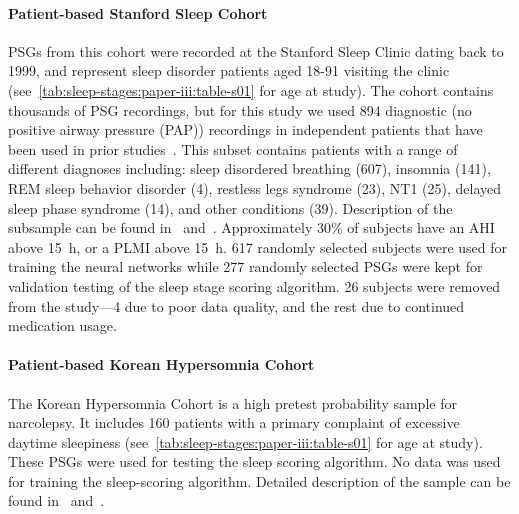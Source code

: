 \paragraph{Patient-based Stanford Sleep Cohort}
\acp{PSG} from this cohort were recorded at the Stanford Sleep Clinic dating back to 1999, and represent sleep disorder patients aged 18-91 visiting the clinic (see~\cref{tab:sleep-stages:paper-iii:table-s01} for age at study).
The cohort contains thousands of \ac{PSG} recordings, but for this study we used 894 diagnostic (no positive airway pressure (PAP)) recordings in independent patients that have been used in prior studies~\cite{Kuna2013}.
This subset contains patients with a range of different diagnoses including: sleep disordered breathing (607), insomnia (141), \ac{REM} sleep behavior disorder (4), restless legs syndrome (23), \ac{NT1} (25), delayed sleep phase syndrome (14), and other conditions (39).
Description of the subsample can be found in~\cite{Andlauer2013} and~\cite{Moore2014}.
Approximately 30\% of subjects have an \ac{AHI} above \SI{15}{\hour}, or a \ac{PLMI} above \SI{15}{\hour}.
617 randomly selected subjects were used for training the neural networks while 277 randomly selected \acp{PSG} were kept for validation testing of the sleep stage scoring algorithm.
26 subjects were removed from the study---4 due to poor data quality, and the rest due to continued medication usage.

\paragraph{Patient-based Korean Hypersomnia Cohort}
The Korean Hypersomnia Cohort is a high pretest probability sample for narcolepsy.
It includes 160 patients with a primary complaint of excessive daytime sleepiness (see~\cref{tab:sleep-stages:paper-iii:table-s01} for age at study).
These \acp{PSG} were used for testing the sleep scoring algorithm.%
No data was used for training the sleep-scoring algorithm.
Detailed description of the sample can be found in~\cite{Hong2006} and~\cite{Andlauer2013}.

